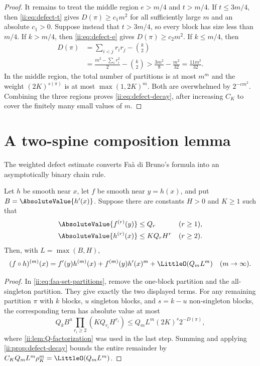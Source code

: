 \begin{proof}
It remains to treat the middle region $e>m/4$ and $t>m/4$.  If $t\leq3m/4$, then
\eqref{ii:eq:defect-t} gives $D(\pi)\geq c_1m^2$ for all sufficiently large $m$ and an
absolute $c_1>0$.  Suppose instead that $t>3m/4$, so every block has size less than
$m/4$.  If $k>m/4$, then \eqref{ii:eq:defect-e} gives
$D(\pi)\geq c_2m^2$.  If $k\leq m/4$, then
\begin{align*}
 D(\pi)
 &=\sum_{i<j}r_ir_j-\binom k2\\
 &=\frac{m^2-\sum_i r_i^2}{2}-\binom k2
 >\frac{3m^2}{8}-\frac{m^2}{32}
 =\frac{11m^2}{32}.
\end{align*}
In the middle region, the total number of partitions is at most $m^m$ and the weight
$(2K)^{s(\pi)}$ is at most $\max(1,2K)^m$.  Both are overwhelmed by
$2^{-c m^2}$.  Combining the three regions proves \eqref{ii:eq:defect-decay}, after
increasing $C_K$ to cover the finitely many small values of $m$.
\end{proof}

\section{A two-spine composition lemma}
\label{ii:sec:two-spine}

The weighted defect estimate converts Fa\`a di Bruno's formula into an asymptotically
binary chain rule.

\begin{lemma}
\label{ii:lem:two-spine}
Let $h$ be smooth near $x$, let $f$ be smooth near $y=h(x)$, and put
$B=\AbsoluteValue{h'(x)}$.  Suppose
there are constants $H>0$ and $K\geq1$ such that
\begin{align}
 \AbsoluteValue{f^{(r)}(y)}&\leq Q_r &&(r\geq1),
 \label{ii:eq:f-envelope}\\
 \AbsoluteValue{h^{(r)}(x)}&\leq KQ_rH^r &&(r\geq2).
 \label{ii:eq:h-envelope}
\end{align}
Then, with $L=\max(B,H)$,
\begin{equation}
 (f\comp h)^{(m)}(x)
 =f'(y)h^{(m)}(x)+f^{(m)}(y)h'(x)^m
  +\LittleO(Q_mL^m)
 \quad(m\to\infty).
 \label{ii:eq:two-spine}
\end{equation}
\end{lemma}

\begin{proof}
In \eqref{ii:eq:faa-set-partitions}, remove the one-block partition and the all-singleton
partition.  They give exactly the two displayed terms.  For any remaining partition
$\pi$ with $k$ blocks, $u$ singleton blocks, and $s=k-u$ non-singleton blocks, the
corresponding term has absolute value at most
\[
 Q_k B^u\prod_{r_i\ge2}(KQ_{r_i}H^{r_i})
 \leq Q_mL^m(2K)^s2^{-D(\pi)},
\]
where \cref{ii:lem:Q-factorization} was used in the last step.  Summing and applying
\cref{ii:prop:defect-decay} bounds the entire remainder by
$C_KQ_mL^m\rho_K^m=\LittleO(Q_mL^m)$.
\end{proof}


